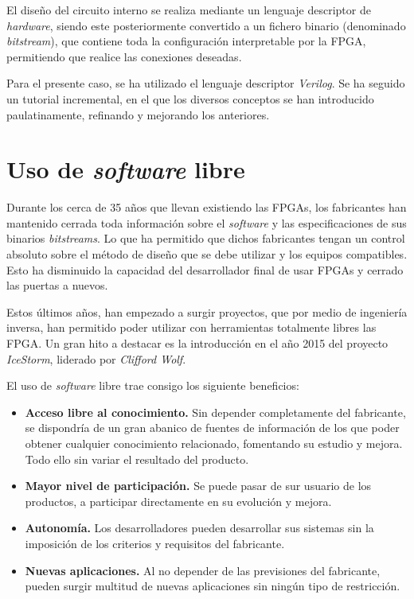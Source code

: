 El diseño del circuito interno se realiza mediante un lenguaje descriptor de \emph{hardware}, siendo este posteriormente convertido a un fichero binario (denominado \emph{bitstream}), que contiene toda la configuración interpretable por la FPGA, permitiendo que realice las conexiones deseadas.

Para el presente caso, se ha utilizado el lenguaje descriptor \emph{Verilog}. Se ha seguido un tutorial incremental\cite{obijuan:tutorial-fpga}, en el que los diversos conceptos se han introducido paulatinamente, refinando y mejorando los anteriores.

\section{Uso de \emph{software} libre}
Durante los cerca de 35 años que llevan existiendo las FPGAs, los fabricantes han mantenido cerrada toda información sobre el \emph{software} y las especificaciones de sus binarios \emph{bitstreams}. Lo que ha permitido que dichos fabricantes tengan un control absoluto sobre el método de diseño que se debe utilizar y los equipos compatibles. Esto ha disminuido la capacidad del desarrollador final de usar FPGAs y cerrado las puertas a nuevos.

Estos últimos años, han empezado a surgir proyectos, que por medio de ingeniería inversa, han permitido poder utilizar con herramientas totalmente libres las FPGA. Un gran hito a destacar es la introducción en el año 2015 del proyecto \emph{IceStorm}, liderado por \emph{Clifford Wolf}.

El uso de \emph{software} libre trae consigo los siguiente beneficios:
\begin{itemize}
    \item \textbf{Acceso libre al conocimiento.} Sin depender completamente del fabricante, se dispondría de un gran abanico de fuentes de información de los que poder obtener cualquier conocimiento relacionado, fomentando su estudio y mejora. Todo ello sin variar el resultado del producto.

    \item \textbf{Mayor nivel de participación.} Se puede pasar de sur usuario de los productos, a participar directamente en su evolución y mejora. 
    
    \item \textbf{Autonomía.} Los desarrolladores pueden desarrollar sus sistemas sin la imposición de los criterios y requisitos del fabricante.

    \item \textbf{Nuevas aplicaciones.} Al no depender de las previsiones del fabricante, pueden surgir multitud de nuevas aplicaciones sin ningún tipo de restricción.
\end{itemize}

